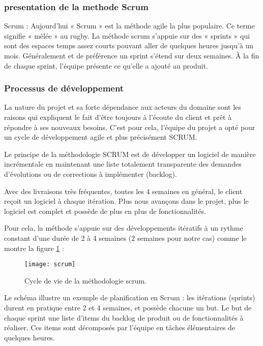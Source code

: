 \clearpage
\subsubsection{presentation de la methode Scrum }
Scrum : Aujourd’hui « Scrum » est la méthode agile la plus populaire. Ce terme signifie «
mêlée » au rugby. La méthode scrum s’appuie sur des « sprints » qui sont des espaces temps
assez courts pouvant aller de quelques heures jusqu’à un mois. Généralement et de préférence
un sprint s’étend sur deux semaines. À la fin de chaque sprint, l’équipe présente ce qu’elle a
ajouté au produit.
\subsubsection{Processus de développement}
La nature du projet et sa forte dépendance aux acteurs du domaine sont les raisons qui expliquent le fait d’être toujours à l’écoute du client et prêt à répondre à ses nouveaux besoins. C’est pour cela, l’équipe du projet a opté pour un cycle de développement agile et plus précisément SCRUM.

\medskip

Le principe de la méthodologie SCRUM est de développer un logiciel de manière incrémentale en maintenant une liste totalement transparente des demandes d'évolutions ou de corrections à implémenter (backlog).

\medskip

Avec des livraisons très fréquentes, toutes les 4 semaines en général, le client reçoit un logiciel à chaque itération. Plus nous avançons dans le projet, plus le logiciel est complet et possède de plus en plus de fonctionnalités.

\medskip

Pour cela, la méthode s'appuie sur des développements itératifs à un rythme constant d'une durée de 2 à 4 semaines (2 semaines pour notre cas) comme le montre la figure \ref{fig:scrum} :

\begin{figure}[ht]
  \centering
  \texttt{[image: scrum]}
  \caption{Cycle de vie de la méthodologie scrum.}
  \label{fig:scrum}
\end{figure}
\FloatBarrier

Le schéma illustre un exemple de planification en Scrum : les itérations (sprints) durent en pratique entre 2 et 4 semaines, et possède chacune un but. Le but de chaque sprint une liste d'items du backlog de produit ou de fonctionnalités à réaliser. Ces items sont décomposés par l'équipe en tâches élémentaires de quelques heures.

